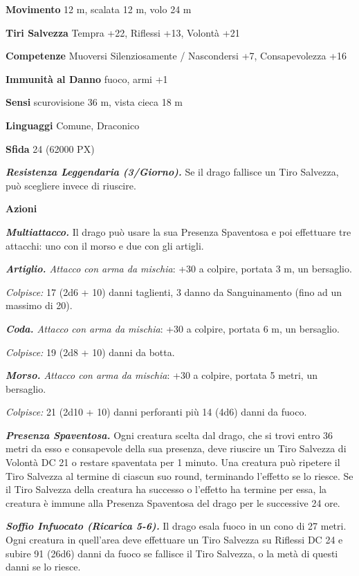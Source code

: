 \begin{multicols}{2}
	\textbf{Movimento} 12 m, scalata 12 m, volo 24 m

	\textbf{Tiri Salvezza} Tempra +22, Riflessi +13, Volontà +21

	\textbf{Competenze} Muoversi Silenziosamente / Nascondersi +7, Consapevolezza +16

	\textbf{Immunità al Danno} fuoco, armi +1

	\textbf{Sensi} scurovisione 36 m, vista cieca 18 m

	\textbf{Linguaggi} Comune, Draconico

	\textbf{Sfida} 24 (62000 PX)

	\textit{\textbf{Resistenza Leggendaria (3/Giorno).}} Se il drago fallisce un Tiro Salvezza, può scegliere invece di riuscire.

	\textbf{Azioni}

	\textit{\textbf{Multiattacco.}} Il drago può usare la sua Presenza Spaventosa e poi effettuare tre attacchi: uno con il morso e due con gli artigli.

	\textit{\textbf{Artiglio.} Attacco con arma da mischia}: +30 a colpire, portata 3 m, un bersaglio.

	\textit{Colpisce:} 17 (2d6 + 10) danni taglienti, 3 danno da Sanguinamento (fino ad un massimo di 20).

	\textit{\textbf{Coda.} Attacco con arma da mischia}: +30 a colpire, portata 6 m, un bersaglio.

	\textit{Colpisce:} 19 (2d8 + 10) danni da botta.

	\textit{\textbf{Morso.} Attacco con arma da mischia}: +30 a colpire, portata 5 metri, un bersaglio.

	\textit{Colpisce:} 21 (2d10 + 10) danni perforanti più 14 (4d6) danni da fuoco.

	\textit{\textbf{Presenza Spaventosa.}} Ogni creatura scelta dal drago, che si trovi entro 36 metri da esso e consapevole della sua presenza, deve riuscire un Tiro Salvezza di Volontà DC 21 o restare spaventata per 1 minuto. Una creatura può ripetere il Tiro Salvezza al termine di ciascun suo round, terminando l'effetto se lo riesce. Se il Tiro Salvezza della creatura ha successo o l'effetto ha termine per essa, la creatura è immune alla Presenza Spaventosa del drago per le successive 24 ore.

	\textit{\textbf{Soffio Infuocato (Ricarica 5-6).}} Il drago esala fuoco in un cono di 27 metri. Ogni creatura in quell'area deve effettuare un Tiro Salvezza su Riflessi DC 24 e subire 91 (26d6) danni da fuoco se fallisce il Tiro Salvezza, o la metà di questi danni se lo riesce.


\end{multicols}
